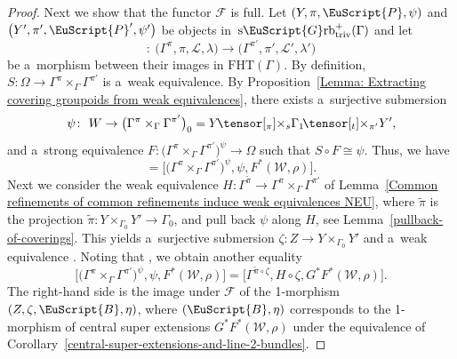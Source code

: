 \documentclass[pdftex]{sigma}
\numberwithin{equation}{section}
\def\mathscr#1{\EuScript{#1}}
\def\ttimes#1#2{\hspace{-0.15em}\tensor[_{#1}]{\times}{_{#2}}}
\newcommand{\Grbtriv}{\mathscr{G}\mathrm{rb}_{\mathrm{triv}}}
\newcommand{\sGrbtriv}{\mathrm{s}\Grbtriv}
\begin{document}
\begin{proof}
Next we show that the functor $\mathcal{F}$ is full.
 Let $(Y,\pi,\mathscr{P},\psi)$ and $\bigl(Y',\pi',\mathscr{P}',\psi'\bigr)$ be objects in~$\sGrbtriv^{+}(\Gamma)$ and let
\begin{equation*}
 [\Omega,S,\mathcal{W},\rho] \colon\ \bigl(\Gamma^\pi,\pi,\mathcal{L},\lambda\bigr)\to \bigl(\Gamma^{\pi'},{\pi'},\mathcal{L}',\lambda'\bigr)
\end{equation*}
be a~morphism between their images in $\mathrm{FHT}(\Gamma)$. By definition, $S\colon \Omega \to \Gamma^{\pi} \times_\Gamma \Gamma^{\pi'}$ is a~weak equivalence.
By Proposition~\ref{Lemma: Extracting covering groupoids from weak equivalences}, there exists a~surjective submersion
\begin{equation*}
\psi\colon\ W \to \bigl(\Gamma^{\pi} \times_\Gamma \Gamma^{\pi'}\bigr)_0=Y \ttimes{\pi}{s} \Gamma_1 \ttimes{t}{\pi'} Y',
\end{equation*}
and a~strong equivalence $F\colon \bigl(\Gamma^{\pi} \times_\Gamma \Gamma^{\pi'}\bigr)^{\psi} \to \Omega$ such that $S \circ F \cong {\psi}$. Thus, we have
\begin{equation*}
[\Omega,S,\mathcal{W},\rho] = \big[\bigl(\Gamma^{\pi} \times_\Gamma \Gamma^{\pi'}\bigr)^{\psi},{\psi},F^{*}(\mathcal{W},\rho)\big].
\end{equation*}
Next we consider the weak equivalence $H\colon \Gamma^{\tilde\pi} \to \Gamma^{\pi} \times_\Gamma \Gamma^{\pi'}$ of Lemma~\ref{Common refinements of common refinements induce weak equivalences NEU}, where $\tilde\pi$ is the projection $\tilde\pi\colon Y \times_{\Gamma_0} Y' \to \Gamma_0$, and pull back $\psi$ along $H$, see Lemma~\ref{pullback-of-coverings}. This yields a~surjective submersion $\zeta\colon Z \to Y \times_{\Gamma_0} Y'$ and a~weak equivalence . Noting that \smash{$\bigl(\Gamma^{\tilde\pi}\bigr)^{\zeta} = \Gamma^{\tilde\pi \circ \zeta}$}, we obtain another equality
\begin{equation*}
\big[\bigl(\Gamma^{\pi} \times_\Gamma \Gamma^{\pi'}\bigr)^{\psi},{\psi},F^{*}(\mathcal{W},\rho)\big] = \big[\Gamma^{\tilde\pi \circ \zeta},H \circ {\zeta},G^{*}F^{*}(\mathcal{W},\rho)\big].
\end{equation*}
The right-hand side is the image under $\mathcal{F}$ of the 1-morphism $(Z,\zeta,\mathscr{B},\eta)$, where $(\mathscr{B},\eta)$ corresponds to the 1-morphism of central super extensions $G^{*}F^{*}(\mathcal{W},\rho)$ under the equivalence of Corollary~\ref{central-super-extensions-and-line-2-bundles}.


\end{proof}
\end{document}
